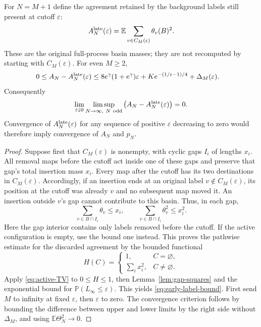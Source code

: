 \documentclass[11pt,letterpaper]{article}
\newcommand{\PP}{\mathbb P}\newcommand{\EE}{\mathbb E}
\begin{document}
\begin{theorem}
\label{thm:early-labels}
For $N=M+1$ define the agreement retained by the background labels still
present at cutoff $\varepsilon$:
\[
 A_N^{\rm late}(\varepsilon)
   =\EE\sum_{v\in C_M(\varepsilon)}\theta_v(B)^2.
\]
These are the original full-process basin masses; they are not recomputed
by starting with $C_M(\varepsilon)$. For even $M\ge2$,
\begin{align}
 0\le A_N-A_N^{\rm late}(\varepsilon)
 \le{}&8e^\gamma(1+e^\gamma)\varepsilon
        +K e^{-(1/\varepsilon-1)/4}
        +\Delta_M(\varepsilon).\label{eq:early-label-bound}
\end{align}
Consequently
\begin{equation}\label{eq:early-label-double-limit}
 \lim_{\varepsilon\downarrow0}\limsup_{N\to\infty,\ N\ {\rm odd}}
       \big(A_N-A_N^{\rm late}(\varepsilon)\big)=0.
\end{equation}
Convergence of $A_N^{\rm late}(\varepsilon)$ for any sequence of positive
$\varepsilon$ decreasing to zero would therefore imply convergence of
$A_N$ and $p_N$.
\end{theorem}
\begin{proof}
Suppose first that $C_M(\varepsilon)$ is nonempty, with cyclic gaps $I_i$
of lengths $x_i$. All removal maps before the cutoff act inside one of
these gaps and preserve that gap's total insertion mass $x_i$. Every map
after the cutoff has its two destinations in $C_M(\varepsilon)$.
Accordingly, if an insertion ends at an original label
$v\notin C_M(\varepsilon)$, its position at the cutoff was already $v$
and no subsequent map moved it. An insertion outside $v$'s gap cannot
contribute to this basin. Thus, in each gap,
\[
 \sum_{v\in B\cap I_i}\theta_v\le x_i,\qquad
 \sum_{v\in B\cap I_i}\theta_v^2\le x_i^2.
\]
Here the gap interior contains only labels removed before the cutoff.
If the active configuration is empty, use the bound one instead. This
proves the pathwise estimate for the discarded agreement by the bounded
functional
\[
 H(C)=\begin{cases}1,&C=\varnothing,\\
                    \sum_i x_i^2,&C\ne\varnothing.
       \end{cases}
\]
Apply \eqref{eq:active-TV} to $0\le H\le1$, then
Lemma~\ref{lem:gap-squares} and the exponential bound for
$\PP(L_\infty\le\varepsilon)$. This yields
\eqref{eq:early-label-bound}. First send $M$ to infinity at fixed
$\varepsilon$, then $\varepsilon$ to zero. The convergence criterion
follows by bounding the difference between upper and lower limits by
the right side without $\Delta_M$, and using $\EE\Theta_N^2\to0$.
\end{proof}
\end{document}
